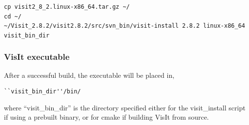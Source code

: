 \documentclass[12pt]{article}
\begin{document}
\begin{enumerate}
\begin{verbatim}
cp visit2_8_2.linux-x86_64.tar.gz ~/
cd ~/
~/Visit_2.8.2/visit2.8.2/src/svn_bin/visit-install 2.8.2 linux-x86_64
visit_bin_dir
\end{verbatim}



\end{enumerate}


\subsubsection{VisIt executable}
\label{sec:VisItExecutable}

After a successful build, the executable will be placed in,

\begin{verbatim}
``visit_bin_dir''/bin/
\end{verbatim}

where ``visit\_bin\_dir'' is the directory specified either for the
visit\_install script if using a prebuilt binary, or for cmake if
building VisIt from source.






\end{document}
